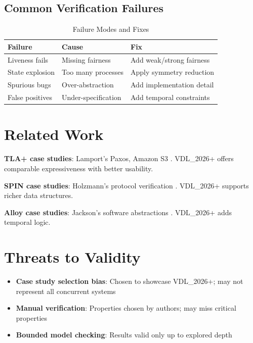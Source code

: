 \documentclass[conference]{IEEEtran}
\begin{document}
\subsection{Common Verification Failures}

\begin{table}[h]
\centering
\caption{Failure Modes and Fixes}
\begin{tabular}{lll}
\toprule
\textbf{Failure} & \textbf{Cause} & \textbf{Fix} \\
\midrule
Liveness fails & Missing fairness & Add weak/strong fairness \\
State explosion & Too many processes & Apply symmetry reduction \\
Spurious bugs & Over-abstraction & Add implementation detail \\
False positives & Under-specification & Add temporal constraints \\
\bottomrule
\end{tabular}
\end{table}

\section{Related Work}

\textbf{TLA+ case studies}: Lamport's Paxos, Amazon S3 \cite{newcombe2015}. VDL\_2026+ offers comparable expressiveness with better usability.

\textbf{SPIN case studies}: Holzmann's protocol verification \cite{holzmann1997}. VDL\_2026+ supports richer data structures.

\textbf{Alloy case studies}: Jackson's software abstractions \cite{jackson2012}. VDL\_2026+ adds temporal logic.

\section{Threats to Validity}

\begin{itemize}
\item \textbf{Case study selection bias}: Chosen to showcase VDL\_2026+; may not represent all concurrent systems
\item \textbf{Manual verification}: Properties chosen by authors; may miss critical properties
\item \textbf{Bounded model checking}: Results valid only up to explored depth
\end{itemize}
\end{document}

